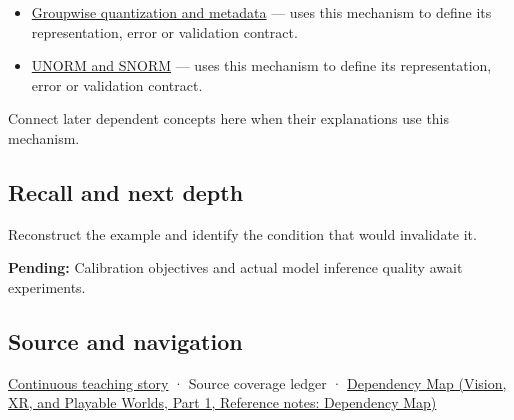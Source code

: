 \hypertarget{appendix-d5da3eaabaef-used-by}{}

\begin{itemize}
\tightlist
\item
  \hyperref[appendix-638204c40e8b]{Groupwise quantization and metadata} --- uses this mechanism to define its representation, error or validation contract.
\item
  \hyperref[appendix-b2402c453dac]{UNORM and SNORM} --- uses this mechanism to define its representation, error or validation contract.
\end{itemize}

Connect later dependent concepts here when their explanations use this mechanism.

\subsection{Recall and next depth}\label{appendix-d5da3eaabaef-recall-and-next-depth}

\hypertarget{appendix-d5da3eaabaef-recall-and-next-depth}{}

Reconstruct the example and identify the condition that would invalidate it.

\textbf{Pending:} Calibration objectives and actual model inference quality await experiments.

\subsection{Source and navigation}\label{appendix-d5da3eaabaef-source-and-navigation}

\hypertarget{appendix-d5da3eaabaef-source-and-navigation}{}

\hyperref[01-foundations-i-ch001-choosing-what-information-to-keep]{Continuous teaching story} · {Source coverage ledger} · \href{../07-Vision-XR-and-Playable-Worlds-P01/main.pdf\#appendix-4ad47bdd269a}{Dependency Map (Vision, XR, and Playable Worlds, Part 1, Reference notes: Dependency Map)}
